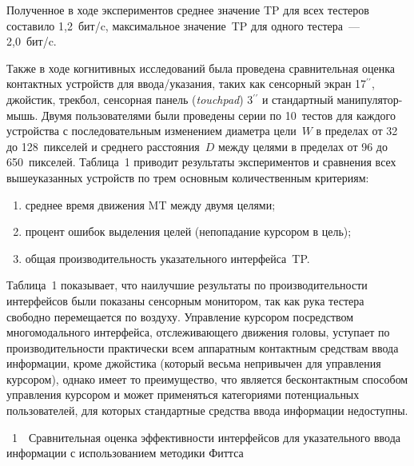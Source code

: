 \begin{multicols}{2}
  Полученное в ходе экспериментов среднее значение TP для всех тестеров 
составило 1,2~бит/c, максимальное значение~TP для одного тестера~--- 
2,0~бит/c.
  
  Также в ходе когнитивных исследований была проведена сравнительная 
оценка контактных устройств для ввода/указания, таких как сенсорный экран 
17$^{\prime\prime}$, джойстик, трекбол, сенсорная панель (\textit{touchpad}) 3$^{\prime\prime}$ 
и  стандартный ма\-ни\-пу\-ля\-тор-мышь. Двумя пользователями были проведены 
серии по 10~тестов для каждого устройства с последовательным изменением 
диаметра цели~$W$ в пределах от 32 до 128~пикселей и среднего 
расстояния~$D$ между целями в пределах от 96 до 650~пикселей. Таблица~1 
приводит результаты экспериментов и сравнения всех вышеуказанных 
устройств по трем основным количественным критериям: 
  \begin{enumerate}[(1)]
\item среднее время движения MT между двумя целями; 
\item процент ошибок выделения целей (непопадание курсором в цель); 
\item общая производительность указательного интерфейса~TP. 
\end{enumerate}


  
  Таблица~1 показывает, что наилучшие резуль\-таты по производительности 
интерфейсов были показа\-ны сенсорным монитором, так как рука тес\-те\-ра 
свободно перемещается по воздуху. Управ\-ление курсором посредством 
многомодального интерфейса, отслеживающего движения головы,\linebreak
 уступает по 
производительности практически всем аппаратным контактным средствам 
ввода информации, кроме джойстика (который весьма непривычен для 
управления курсором), однако имеет то преимущество, что является 
бесконтактным способом управления курсором и может применяться 
категориями потенциальных пользователей, для которых стандартные средства 
ввода информации недоступны.

\vspace*{12pt}

\noindent
{{\tablename~1}\ \ \small{Сравнительная оценка эффективности интерфейсов для указательного ввода 
информации с использованием методики Фиттса}}

    

\end{multicols}
